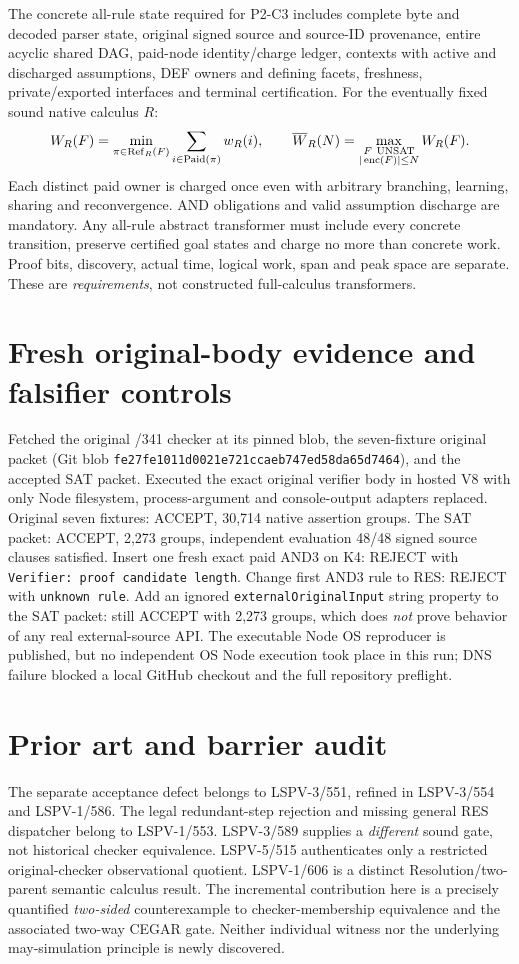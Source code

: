 \documentclass[11pt]{article}
\begin{document}
The concrete all-rule state required for P2-C3 includes complete byte and decoded parser state, original signed source and source-ID provenance, entire acyclic shared DAG, paid-node identity/charge ledger, contexts with active and discharged assumptions, DEF owners and defining facets, freshness, private/exported interfaces and terminal certification. For the eventually fixed sound native calculus \(R\):
\[
W_R(F)=\min_{\pi\in {\rm Ref}_R(F)}
 \sum_{i\in{\rm Paid}(\pi)}w_R(i),\qquad
\overline W_R(N)=\max_{\substack{F\ {\rm UNSAT}\\|\operatorname{enc}(F)|\le N}}W_R(F).
\]
Each distinct paid owner is charged once even with arbitrary branching, learning, sharing and reconvergence. AND obligations and valid assumption discharge are mandatory. Any all-rule abstract transformer must include every concrete transition, preserve certified goal states and charge no more than concrete work. Proof bits, discovery, actual time, logical work, span and peak space are separate. These are \emph{requirements}, not constructed full-calculus transformers.

\section*{Fresh original-body evidence and falsifier controls}
Fetched the original /341 checker at its pinned blob, the seven-fixture original packet (Git blob \texttt{fe27fe1011d0021e721ccaeb747ed58da65d7464}), and the accepted SAT packet. Executed the exact original verifier body in hosted V8 with only Node filesystem, process-argument and console-output adapters replaced. Original seven fixtures: ACCEPT, 30,714 native assertion groups. The SAT packet: ACCEPT, 2,273 groups, independent evaluation 48/48 signed source clauses satisfied. Insert one fresh exact paid AND3 on K4: REJECT with \texttt{Verifier: proof candidate length}. Change first AND3 rule to RES: REJECT with \texttt{unknown rule}. Add an ignored \texttt{externalOriginalInput} string property to the SAT packet: still ACCEPT with 2,273 groups, which does \emph{not} prove behavior of any real external-source API. The executable Node OS reproducer is published, but no independent OS Node execution took place in this run; DNS failure blocked a local GitHub checkout and the full repository preflight.

\section*{Prior art and barrier audit}
The separate acceptance defect belongs to LSPV-3/551, refined in LSPV-3/554 and LSPV-1/586. The legal redundant-step rejection and missing general RES dispatcher belong to LSPV-1/553. LSPV-3/589 supplies a \emph{different} sound gate, not historical checker equivalence. LSPV-5/515 authenticates only a restricted original-checker observational quotient. LSPV-1/606 is a distinct Resolution/two-parent semantic calculus result. The incremental contribution here is a precisely quantified \emph{two-sided} counterexample to checker-membership equivalence and the associated two-way CEGAR gate. Neither individual witness nor the underlying may-simulation principle is newly discovered.
\end{document}
